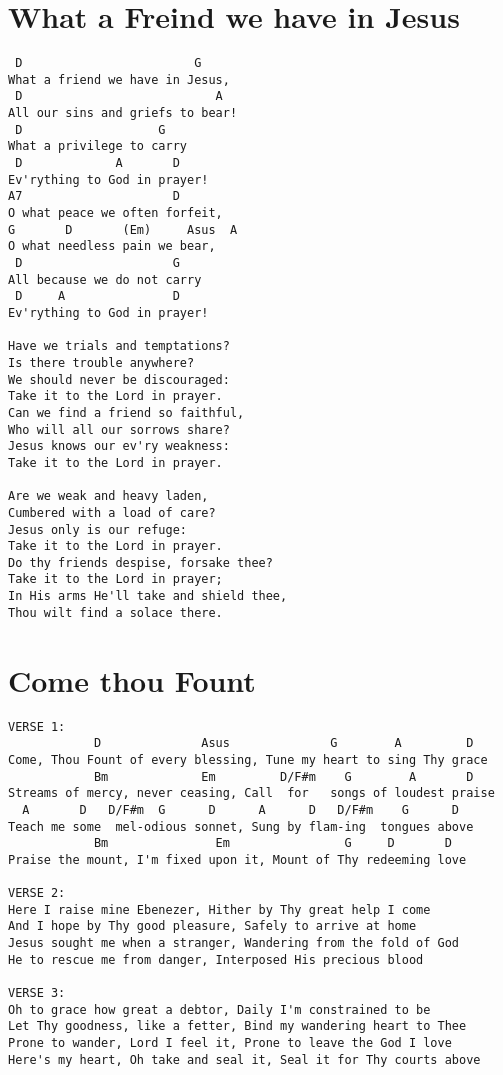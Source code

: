 \documentclass[leqno]{memoir}
\begin{document}
\chapter{What a Freind we have in Jesus}
\begin{verbatim}
 D                        G
What a friend we have in Jesus,
 D                           A
All our sins and griefs to bear!
 D                   G
What a privilege to carry
 D             A       D
Ev'rything to God in prayer!
A7                     D
O what peace we often forfeit,
G       D       (Em)     Asus  A
O what needless pain we bear,
 D                     G
All because we do not carry
 D     A               D
Ev'rything to God in prayer!

Have we trials and temptations?
Is there trouble anywhere?
We should never be discouraged:
Take it to the Lord in prayer.
Can we find a friend so faithful,
Who will all our sorrows share?
Jesus knows our ev'ry weakness:
Take it to the Lord in prayer.

Are we weak and heavy laden,
Cumbered with a load of care?
Jesus only is our refuge:
Take it to the Lord in prayer.
Do thy friends despise, forsake thee?
Take it to the Lord in prayer;
In His arms He'll take and shield thee,
Thou wilt find a solace there.

\end{verbatim}
\newpage

\chapter{Come thou Fount}
\begin{verbatim}
VERSE 1:
            D              Asus              G        A         D
Come, Thou Fount of every blessing, Tune my heart to sing Thy grace
            Bm             Em         D/F#m    G        A       D
Streams of mercy, never ceasing, Call  for   songs of loudest praise
  A       D   D/F#m  G      D      A      D   D/F#m    G      D
Teach me some  mel-odious sonnet, Sung by flam-ing  tongues above
            Bm               Em                G     D       D
Praise the mount, I'm fixed upon it, Mount of Thy redeeming love

VERSE 2:
Here I raise mine Ebenezer, Hither by Thy great help I come
And I hope by Thy good pleasure, Safely to arrive at home
Jesus sought me when a stranger, Wandering from the fold of God
He to rescue me from danger, Interposed His precious blood

VERSE 3:
Oh to grace how great a debtor, Daily I'm constrained to be
Let Thy goodness, like a fetter, Bind my wandering heart to Thee
Prone to wander, Lord I feel it, Prone to leave the God I love
Here's my heart, Oh take and seal it, Seal it for Thy courts above

\end{verbatim}
\newpage
\end{document}

